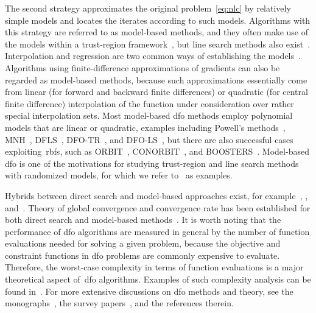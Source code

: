 \documentclass[11pt,draft]{article}
\numberwithin{equation}{section}
\def\boosters{\mbox{BOOSTERS}}
\def\conorbit{\mbox{CONORBIT}}
\def\orbit{\mbox{ORBIT}}
\begin{document}
The second strategy approximates the original problem~\eqref{eq:nlc} by relatively simple models and locates the iterates according to such models.
Algorithms with this strategy are referred to as model-based methods, and they often make use of the
models within a trust-region
framework~\cite{Conn_Gould_Toint_2000,Conn_Scheinberg_Vicente_2009a,Yuan_2015}, but
line search methods also exist~\cite{Berahas_Byrd_Nocedal_2019,Shi_Etal_2021}.
Interpolation and regression are two common ways of establishing the
models~\cite{Powell_2001,Powell_2004a,Conn_Scheinberg_Vicente_2008a,Conn_Scheinberg_Vicente_2008a,Wild_Regis_Shoemaker_2008,Bandeira_Scheinberg_Vicente_2012,Billups_Larson_Graf_2013,Regis_Wild_2017}.
Algorithms using finite-difference approximations of gradients can also be
regarded as model-based methods, because such approximations essentially come from linear (for
forward and backward finite differences) or quadratic (for central finite difference) interpolation
of the function under consideration over rather special interpolation sets.
Most model-based \gls{dfo} methods employ polynomial models that are linear or
quadratic, examples including
Powell's methods~\cite{Powell_1994,Powell_2002,Powell_2006,Powell_2009},
MNH~\cite{Wild_2008}, DFLS~\cite{Zhang_Conn_Scheinberg_2010},
\mbox{DFO-TR}~\cite{Bandeira_Scheinberg_Vicente_2012},
and \mbox{DFO-LS}~\cite{Cartis_Etal_2019},
but there are also successful cases exploiting~\glspl{rbf},
such as \orbit~\cite{Wild_Regis_Shoemaker_2008},
\conorbit~\cite{Regis_Wild_2017}, and \boosters~\cite{Oeuvray_Bierlaire_2009}. Model-based
\gls{dfo} is one of the motivations for studying trust-region and line search methods with
randomized models, for which we refer
to~\cite{Bandeira_Scheinberg_Vicente_2014,Gratton_Etal_2018,Cartis_Scheinberg_2018} as examples.

Hybrids between direct search and model-based approaches exist, for
example~\cite{Custodio_Vicente_2007}, \cite[Algorithm~4.7]{Kelley_2011},
and~\cite{Conn_Digabel_2013}. Theory of global convergence and convergence rate has been established
for both direct search and model-based
methods~\cite{Torczon_1997,Conn_Scheinberg_Toint_1997a,Kolda_Lewis_Torczon_2003,Conn_Scheinberg_Vicente_2009a,
Powell_2012,Vicente_2013,Dodangeh_Vicente_2016,Garmanjani_Judice_Vicente_2016,Gratton_Royer_Vicente_2020}.
It is worth noting that the performance of
\gls{dfo} algorithms are measured in general by the number of function evaluations needed for solving
a given problem, because the objective and constraint functions in \gls{dfo} problems are commonly
expensive to evaluate. Therefore, the worst-case complexity in terms of function evaluations is a major
theoretical aspect of~\gls{dfo} algorithms. Examples of such complexity analysis can be found
in~\cite{Vicente_2013,Gratton_Etal_2015,Dodangeh_Vicente_2016,Dodangeh_Vicente_Zhang_2016}.
For more extensive discussions on \gls{dfo} methods and theory, see the
monographs~\cite{Conn_Scheinberg_Vicente_2009b,Audet_Hare_2017}, the survey
papers~\cite{Rios_Sahinidis_2013, Custodio_Scheinberg_Vicente_2017, Larson_Menickelly_Wild_2019},
and the references therein.
\end{document}
